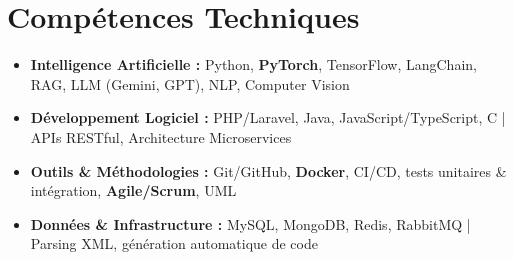 \documentclass[a4paper,11pt]{article}
\begin{document}
\section{Compétences Techniques}
\begin{itemize}[leftmargin=*, nosep]
\item \small{\textbf{Intelligence Artificielle :} Python, \textbf{PyTorch}, TensorFlow, LangChain, RAG, LLM (Gemini, GPT), NLP, Computer Vision}
\item \small{\textbf{Développement Logiciel :} PHP/Laravel, Java, JavaScript/TypeScript, C | APIs RESTful, Architecture Microservices}
\item \small{\textbf{Outils \& Méthodologies :} Git/GitHub, \textbf{Docker}, CI/CD, tests unitaires \& intégration, \textbf{Agile/Scrum}, UML}
\item \small{\textbf{Données \& Infrastructure :} MySQL, MongoDB, Redis, RabbitMQ | Parsing XML, génération automatique de code}
\end{itemize}

\end{document}
